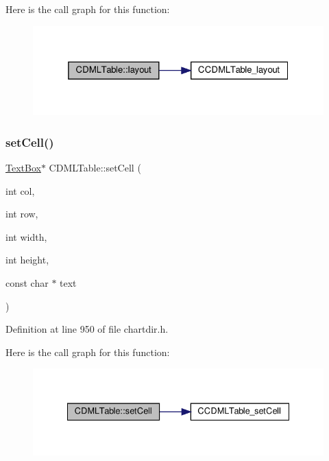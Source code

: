 Here is the call graph for this function\+:
\nopagebreak
\begin{figure}[H]
\begin{center}
\leavevmode
\includegraphics[width=325pt]{class_c_d_m_l_table_a78682ffb191bc413e1d1790399e4aeed_cgraph}
\end{center}
\end{figure}
\mbox{\label{class_c_d_m_l_table_a0721f5e22efe702444137302cb8a0eeb}} 
\subsubsection{\texorpdfstring{set\+Cell()}{setCell()}}
{\footnotesize\ttfamily \hyperlink{class_text_box}{Text\+Box}$\ast$ C\+D\+M\+L\+Table\+::set\+Cell (\begin{DoxyParamCaption}\item[{int}]{col,  }\item[{int}]{row,  }\item[{int}]{width,  }\item[{int}]{height,  }\item[{const char $\ast$}]{text }\end{DoxyParamCaption})\hspace{0.3cm}{\ttfamily [inline]}}



Definition at line 950 of file chartdir.\+h.

Here is the call graph for this function\+:
\nopagebreak
\begin{figure}[H]
\begin{center}
\leavevmode
\includegraphics[width=335pt]{class_c_d_m_l_table_a0721f5e22efe702444137302cb8a0eeb_cgraph}
\end{center}
\end{figure}
\mbox{\label{class_c_d_m_l_table_ae3601809a2a92183ceb02a33644cfd89}} 
